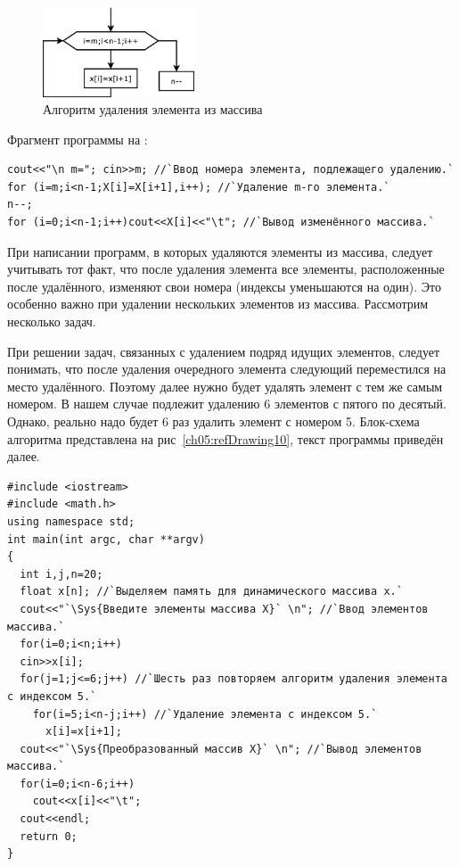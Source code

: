 \begin{figure}[htb]
\begin{center}
\includegraphics[width=0.4\textwidth]{img/ris_5_10}
\caption{Алгоритм удаления элемента из массива}
\label{ch05:refDrawing9}
\end{center}
\end{figure}

Фрагмент программы на :
\begin{lstlisting}
cout<<"\n m="; cin>>m; //`Ввод номера элемента, подлежащего удалению.` 
for (i=m;i<n-1;X[i]=X[i+1],i++); //`Удаление m-го элемента.`
n--;
for (i=0;i<n-1;i++)cout<<X[i]<<"\t"; //`Вывод изменённого массива.`
\end{lstlisting}

При написании программ, в которых удаляются элементы из массива, следует учитывать тот факт, что после удаления элемента
все элементы, расположенные после удалённого, изменяют свои номера (индексы уменьшаются на один). Это особенно важно
при удалении нескольких элементов из массива. Рассмотрим несколько задач.


При решении задач, связанных с удалением подряд идущих элементов, следует понимать, что после удаления очередного
элемента следующий переместился на место удалённого. Поэтому далее нужно будет удалять элемент с тем же самым номером. В
нашем случае подлежит удалению 6 элементов с пятого по десятый. Однако, реально надо будет 6 раз удалить элемент с
номером 5. Блок-схема алгоритма представлена на рис~\ref{ch05:refDrawing10}, текст программы приведён далее.
\begin{lstlisting}
#include <iostream>
#include <math.h>
using namespace std;
int main(int argc, char **argv)
{
  int i,j,n=20;
  float x[n]; //`Выделяем память для динамического массива x.`
  cout<<"`\Sys{Введите элементы массива X}` \n"; //`Ввод элементов массива.`
  for(i=0;i<n;i++)
  cin>>x[i];
  for(j=1;j<=6;j++) //`Шесть раз повторяем алгоритм удаления элемента с индексом 5.`
    for(i=5;i<n-j;i++) //`Удаление элемента с индексом 5.`
      x[i]=x[i+1];
  cout<<"`\Sys{Преобразованный массив X}` \n"; //`Вывод элементов массива.`
  for(i=0;i<n-6;i++)
    cout<<x[i]<<"\t";
  cout<<endl;
  return 0;
}
\end{lstlisting}


